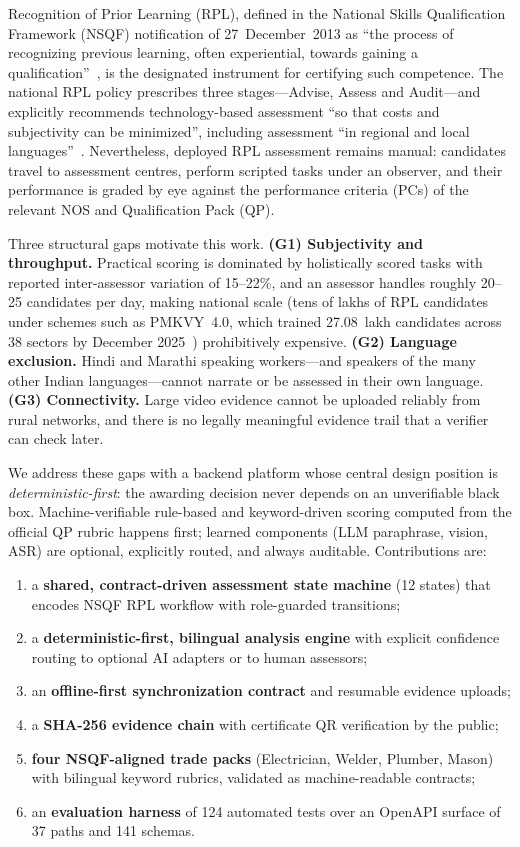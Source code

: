 \documentclass[conference]{IEEEtran}
\begin{document}
Recognition of Prior Learning (RPL), defined in the National Skills Qualification Framework
(NSQF) notification of 27~December~2013 as ``the process of recognizing previous learning,
often experiential, towards gaining a qualification''~\cite{nsqf_notification}, is the
designated instrument for certifying such competence. The national RPL policy prescribes
three stages---Advise, Assess and Audit---and explicitly recommends technology-based
assessment ``so that costs and subjectivity can be minimized'', including assessment
``in regional and local languages''~\cite{unesco_uil,ncvet_rpl}. Nevertheless, deployed RPL
assessment remains manual: candidates travel to assessment centres, perform scripted tasks
under an observer, and their performance is graded by eye against the performance criteria
(PCs) of the relevant NOS and Qualification Pack (QP).

Three structural gaps motivate this work. \textbf{(G1) Subjectivity and throughput.}
Practical scoring is dominated by holistically scored tasks with reported inter-assessor
variation of 15--22\%, and an assessor handles roughly 20--25 candidates per day, making
national scale (tens of lakhs of RPL candidates under schemes such as PMKVY~4.0, which
trained 27.08~lakh candidates across 38 sectors by December 2025~\cite{pib_2025})
prohibitively expensive. \textbf{(G2) Language exclusion.} Hindi and Marathi speaking
workers---and speakers of the many other Indian languages---cannot narrate or be assessed
in their own language. \textbf{(G3) Connectivity.} Large video evidence cannot be uploaded
reliably from rural networks, and there is no legally meaningful evidence trail that a
verifier can check later.

We address these gaps with a backend platform whose central design position is
\textit{deterministic-first}: the awarding decision never depends on an unverifiable black
box. Machine-verifiable rule-based and keyword-driven scoring computed from the official QP
rubric happens first; learned components (LLM paraphrase, vision, ASR) are optional,
explicitly routed, and always auditable. Contributions are:

\begin{enumerate}
  \item a \textbf{shared, contract-driven assessment state machine} (12 states) that encodes
        NSQF RPL workflow with role-guarded transitions;
  \item a \textbf{deterministic-first, bilingual analysis engine} with explicit confidence
        routing to optional AI adapters or to human assessors;
  \item an \textbf{offline-first synchronization contract} and resumable evidence uploads;
  \item a \textbf{SHA-256 evidence chain} with certificate QR verification by the public;
  \item \textbf{four NSQF-aligned trade packs} (Electrician, Welder, Plumber, Mason) with
        bilingual keyword rubrics, validated as machine-readable contracts;
  \item an \textbf{evaluation harness} of 124 automated tests over an OpenAPI surface of
        37 paths and 141 schemas.
\end{enumerate}
\end{document}
